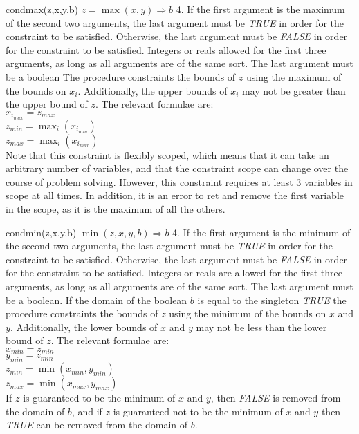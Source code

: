     {condmax(z,x,y,b)}
    {$z=\max(x,y) \Rightarrow b$}
    {4.  If the first argument is the maximum of the second two arguments,
    the last argument must be {\em TRUE} in order for the constraint to be satisfied.
    Otherwise, the last argument must be {\em FALSE} in order for the constraint to 
    be satisfied.}
    {Integers or reals allowed for the first three arguments, as long as all arguments
    are of the same sort.  The last argument must be a boolean}
    {The procedure constraints the bounds of $z$
    using the maximum of the bounds on $x_i$.  Additionally, the upper bounds
    of $x_i$ may not be greater than the upper bound of $z$.  The relevant
    formulae are:\\
    $x_{i_{max}} = z_{max}$\\
    $z_{min} = \max_i(x_{i_{min}})$\\
    $z_{max} = \max_i(x_{i_{max}})$\\
    Note that this constraint is
    flexibly scoped, which means that it can take an arbitrary number of variables,
    and that the constraint scope can change over the course of problem solving.
    However, this constraint requires at least 3 variables in scope at all times.
    In addition, it is an error to ret and remove the first variable in the scope,
    as it is the maximum of all the others.}

    {condmin(z,x,y,b)}
    {$\min(z,x,y,b) \Rightarrow b$}
    {4.  If the first argument is the minimum of the second two arguments,
    the last argument must be {\em TRUE} in order for the constraint to be satisfied.
    Otherwise, the last argument must be {\em FALSE} in order for the constraint to 
    be satisfied.}
    {Integers or reals are allowed for the first three arguments, as long as all arguments
    are of the same sort.  The last argument must be a boolean.}
    {If the domain of the boolean $b$ is equal to the singleton {\em TRUE}
    the procedure constraints the bounds of $z$
    using the minimum of the bounds on $x$ and $y$.  Additionally, the lower bounds
    of $x$ and $y$ may not be less than the lower bound of $z$.  The relevant
    formulae are:\\
    $x_{min} = z_{min}$\\
    $y_{min} = z_{min}$\\
    $z_{min} = \min(x_{min},y_{min})$\\
    $z_{max} = \min(x_{max},y_{max})$\\
    If $z$ is guaranteed to be the minimum of $x$ and $y$, then {\em FALSE} is
    removed from the domain of $b$, and if $z$ is guaranteed not to be the minimum
    of $x$ and $y$ then {\em TRUE} can be removed from the domain of $b$.}


